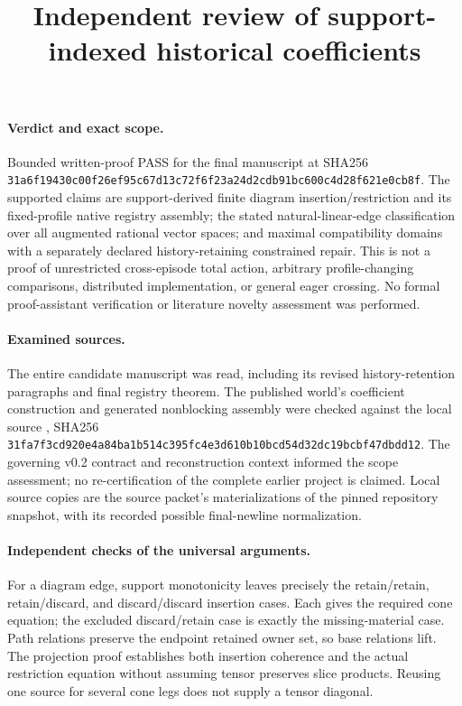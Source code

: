\documentclass{article}
\title{Independent review of support-indexed historical coefficients}
\author{}\date{}
\begin{document}
\maketitle
\paragraph{Verdict and exact scope.}
Bounded written-proof PASS for the final manuscript at SHA256
\texttt{31a6f19430c00f26ef95c67d13c72f6f23a24d2cdb91bc600c4d28f621e0cb8f}.
The supported claims are support-derived finite diagram insertion/restriction and its fixed-profile native registry assembly; the stated natural-linear-edge classification over all augmented rational vector spaces; and maximal compatibility domains with a separately declared history-retaining constrained repair. This is not a proof of unrestricted cross-episode total action, arbitrary profile-changing comparisons, distributed implementation, or general eager crossing. No formal proof-assistant verification or literature novelty assessment was performed.

\paragraph{Examined sources.}
The entire candidate manuscript was read, including its revised history-retention paragraphs and final registry theorem. The published world's coefficient construction and generated nonblocking assembly were checked against the local source
, SHA256
\texttt{31fa7f3cd920e4a84ba1b514c395fc4e3d610b10bcd54d32dc19bcbf47dbdd12}.
The governing v0.2 contract and reconstruction context informed the scope assessment; no re-certification of the complete earlier project is claimed. Local source copies are the source packet's materializations of the pinned repository snapshot, with its recorded possible final-newline normalization.

\paragraph{Independent checks of the universal arguments.}
For a diagram edge, support monotonicity leaves precisely the retain/retain, retain/discard, and discard/discard insertion cases. Each gives the required cone equation; the excluded discard/retain case is exactly the missing-material case. Path relations preserve the endpoint retained owner set, so base relations lift. The projection proof establishes both insertion coherence and the actual restriction equation without assuming tensor preserves slice products. Reusing one source for several cone legs does not supply a tensor diagonal.
\end{document}
